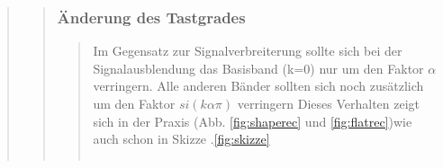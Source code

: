 \begin{quote}
\begin{quote}
        
        \subsubsection{Änderung des Tastgrades}
        \begin{quote}
            
                      
             Im Gegensatz zur Signalverbreiterung sollte sich bei der Signalausblendung das Basisband (k=0) nur um den
             Faktor $\alpha$ verringern.
             Alle anderen Bänder sollten sich noch zusätzlich um den Faktor $si(k\alpha\pi)$ verringern%
             Dieses Verhalten zeigt sich in der Praxis (Abb. \ref{fig:shaperec} und \ref{fig:flatrec})wie auch schon
             in Skizze .\ref{fig:skizze}
             
             
             
             
            \begin{center}
            \begin{tabular}{ll}
            

\end{tabular}
\end{center}
\end{quote}
\end{quote}
\end{quote}
